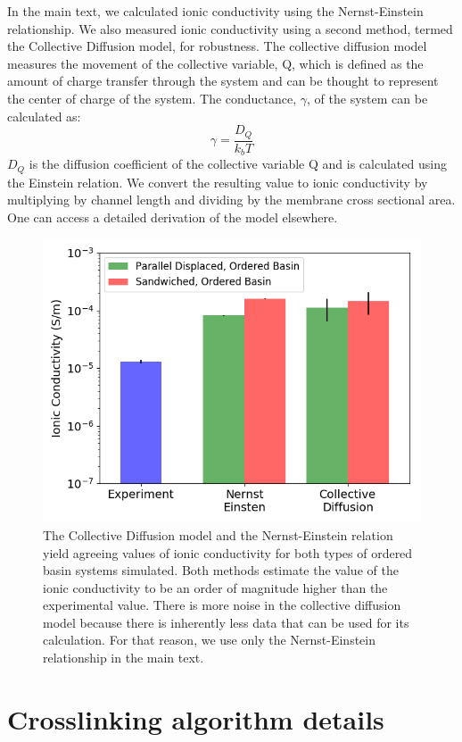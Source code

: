 \documentclass{article}
\begin{document}
  In the main text, we calculated ionic conductivity using the Nernst-Einstein 
  relationship. We also measured ionic conductivity using a second method, 
  termed the Collective Diffusion model, for robustness. The collective 
  diffusion model measures the movement of the collective variable, Q, which
  is defined as the amount of charge transfer through the system and can be 
  thought to represent the center of charge of the system. The conductance, 
  $\gamma$, of the system can be calculated as:
  \begin{equation}
	 \gamma = \dfrac{D_Q}{k_b T} 
	\label{eqn:collective_diffusion}
  \end{equation}
  $D_Q$ is the diffusion coefficient of the collective variable Q and is 
  calculated using the Einstein relation. We convert the resulting value
  to ionic conductivity by multiplying by channel length and dividing by
  the membrane cross sectional area. One can access a detailed derivation of 
  the model elsewhere\cite{liu_collective_2013}.
  
  \begin{figure}[!htb]
        \centering
        \includegraphics[width=0.5\linewidth]{Ionic_conductivity.png}
        \caption{The Collective Diffusion model and the Nernst-Einstein relation yield
        agreeing values of ionic conductivity for both types of ordered basin systems 
        simulated. Both methods estimate the value of the ionic conductivity to be an 
        order of magnitude higher than the experimental value. There is more noise in
        the collective diffusion model because there is inherently less data that 
        can be used for its calculation. For that reason, we use only the Nernst-Einstein relationship in the main text.}
        \label{fig:conductivity}
  \end{figure}  
  
  \section{Crosslinking algorithm details}\label{section:xlink}
\end{document}
